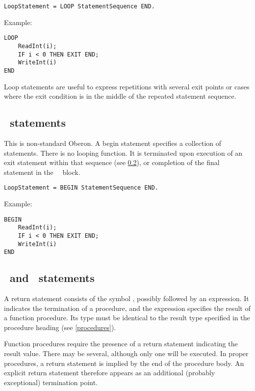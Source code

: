 \documentclass[12pt]{article}
\begin{document}
\begin{lstlisting}[style=example]
LoopStatement = LOOP StatementSequence END.
\end{lstlisting} 

Example:
\begin{lstlisting}[style=example]
LOOP
    ReadInt(i);
    IF i < 0 THEN EXIT END; 
    WriteInt(i)
END
\end{lstlisting} 

Loop statements are useful to express repetitions with several exit points or cases where the exit condition is in the middle of the repeated statement sequence.

\subsection{\BEGIN\ statements}

This is non-standard Oberon. A begin statement specifies a collection of statements. There is no looping function.  It is terminated upon execution of an exit statement within that sequence (see \ref{return}), or completion of the final statement in the \BEGIN\ \END\ block.

\begin{lstlisting}[style=example]
LoopStatement = BEGIN StatementSequence END.
\end{lstlisting} 

Example:
\begin{lstlisting}[style=example]
BEGIN
    ReadInt(i);
    IF i < 0 THEN EXIT END; 
    WriteInt(i)
END
\end{lstlisting} 

\subsection{\RETURN\ and \EXIT\ statements}
\label{return}

A return statement consists of the symbol \RETURN, possibly followed by an expression. It indicates the termination of a procedure, and the expression specifies the result of a function procedure. Its type must be identical to the result type specified in the procedure heading (see \ref{procedures}).

Function procedures require the presence of a return statement indicating the result value. There may be several, although only one will be executed. In proper procedures, a return statement is implied by the end of the procedure body. An explicit return statement therefore appears as an additional (probably exceptional) termination point.
\end{document}
